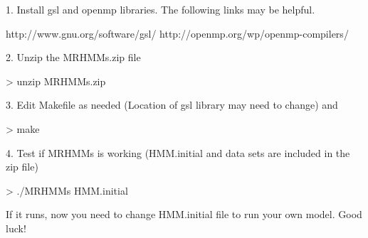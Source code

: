 

1. Install gsl and openmp libraries. The following links may be helpful.

http://www.gnu.org/software/gsl/
http://openmp.org/wp/openmp-compilers/


2. Unzip the MRHMMs.zip file

> unzip MRHMMs.zip

3. Edit Makefile as needed (Location of gsl library may need to change) and 

> make 

4. Test if MRHMMs is working  (HMM.initial and data sets are included
in the zip file)

> ./MRHMMs HMM.initial


If it runs, now you need to change HMM.initial file to run your own
model. Good luck!
